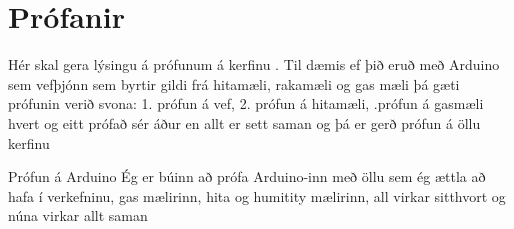 \section{Prófanir}
Hér skal gera lýsingu á prófunum á kerfinu . Til dæmis ef þið eruð með Arduino sem vefþjónn sem byrtir gildi frá hitamæli, rakamæli og gas mæli þá gæti prófunin verið svona: 1. prófun á vef, 2. prófun á hitamæli, .prófun á gasmæli hvert og eitt prófað sér áður en allt er sett saman og þá er gerð prófun á öllu kerfinu

Prófun á Arduino
Ég er búinn að prófa Arduino-inn með öllu sem ég ættla að hafa í verkefninu, gas mælirinn, hita og humitity mælirinn, all virkar sitthvort og núna virkar allt saman 
